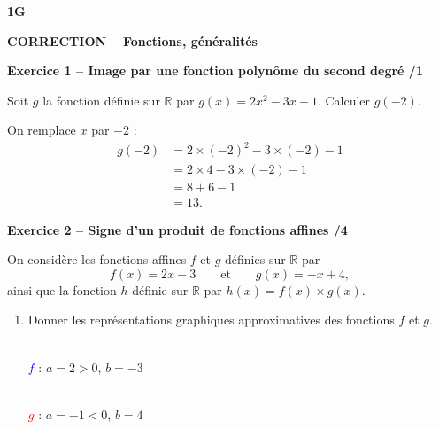 \documentclass[10pt,a4paper]{article}
\renewcommand{\niveau}{1G}
\renewcommand{\chapitre}{Fonctions, généralités}
\renewcommand{\interroversion}[1]{
    \noindent\textbf{\niveau}

    \vspace{-0.5cm}
    \begin{center}
        \textbf{\large CORRECTION -- \chapitre}
    \end{center}

    \vspace{0.1cm}
}
\begin{document}
\footnotesize


\begin{sujets}

\interroversion{A}

\textbf{Exercice 1 -- Image par une fonction polynôme du second degré \hfill /1}

Soit \(g\) la fonction définie sur \(\mathbb{R}\) par \(g(x)=2x^2-3x-1\). Calculer \(g(-2)\).

On remplace \(x\) par \(-2\) :
\[
\begin{aligned}
g(-2) &= 2\times(-2)^2-3\times(-2)-1\\
      &= 2\times4-3\times(-2)-1\\
      &= 8+6-1\\
      &= 13.
\end{aligned}
\]

\textbf{Exercice 2 -- Signe d'un produit de fonctions affines \hfill /4}

On considère les fonctions affines \(f\) et \(g\) définies sur \(\mathbb{R}\) par
\[
f(x)=2x-3 \qquad\text{et}\qquad g(x)=-x+4,
\]
ainsi que la fonction \(h\) définie sur \(\mathbb{R}\) par \(h(x)=f(x)\times g(x)\).

\begin{enumerate}
\item Donner les représentations graphiques approximatives des fonctions \(f\) et \(g\).

\begin{center}
\begin{minipage}{2.6cm}
\centering
{}\\[2pt]
{\scriptsize \textcolor{blue}{\(f\)} : \(a=2>0\), \(b=-3\)}
\end{minipage}
\hspace{0.3cm}
\begin{minipage}{2.6cm}
\centering
{}\\[2pt]
{\scriptsize \textcolor{red}{\(g\)} : \(a=-1<0\), \(b=4\)}
\end{minipage}
\end{center}


\end{enumerate}
\end{sujets}
\end{document}
